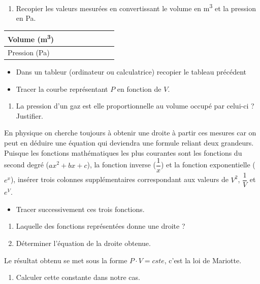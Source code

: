 \documentclass[a4paper,11pt,fleqn]{article}%
\begin{document}
\begin{enumerate}
	\item Recopier les valeurs mesurées en convertissant le volume en \unit{\meter\cubed} et la pression en \unit{\pascal}.
\end{enumerate}

\begin{center}
	\begin{tabular}{|>{\centering}m{.15\linewidth}|>{\centering}m{.08\linewidth}|>{\centering}m{.08\linewidth}|>{\centering}m{.08\linewidth}|>{\centering}m{.08\linewidth}|>{\centering}m{.08\linewidth}|>{\centering}m{.08\linewidth}|>{\centering}m{.08\linewidth}|>{\centering\arraybackslash}m{.08\linewidth}|}
		\hline
		Volume (\unit{\cubic\meter}) & & & & & & & & \\
		\hline
		Pression (\unit{\pascal}) & & & & & & & & \\
		\hline
	\end{tabular}
\end{center}

\begin{itemize}
	\item Dans un tableur (ordinateur ou calculatrice) recopier le tableau précédent
	\item Tracer la courbe représentant $P$ en fonction de $V$.
\end{itemize}

\begin{enumerate}[resume]
	\item La pression d'un gaz est elle proportionnelle au volume occupé par celui-ci ? Justifier.
\end{enumerate}

En physique on cherche toujours à obtenir une droite à partir ces mesures car on peut en déduire une équation qui deviendra une formule reliant deux grandeurs. Puisque les fonctions mathématiques les plus courantes sont les fonctions du second degré ($ax^2 +bx +c$), la fonction inverse ($\dfrac{1}{x}$) et la fonction exponentielle ($e^x$), insérer trois colonnes supplémentaires correspondant aux valeurs de $V^2$, $\dfrac{1}{V}$ et $e^V$. 

\begin{itemize}
	\item Tracer successivement ces trois fonctions.
\end{itemize}

\begin{enumerate}[resume]
	\item Laquelle des fonctions représentées donne une droite ?
	\item Déterminer l'équation de la droite obtenue.
\end{enumerate}

Le résultat obtenu se met sous la forme $P\cdot V =cste$,  c'est la loi de Mariotte.
\begin{enumerate}[resume]
	\item Calculer cette constante dans notre cas.
\end{enumerate}
\end{document}
